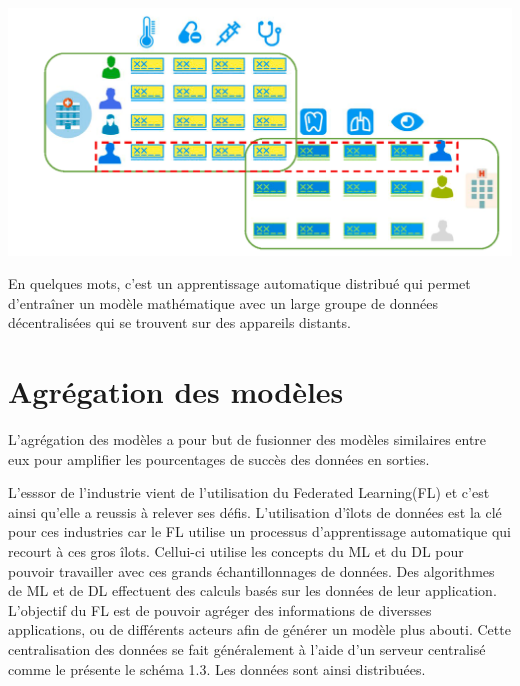 \documentclass[12pt,a4paper,french]{report}
\begin{document}
\begin{center}
	\includegraphics[scale=0.2]{fl_distribute}
	\label{fig1}
\end{center}

En quelques mots, c'est un apprentissage automatique distribué qui permet d'entraîner un modèle mathématique avec un large groupe de données décentralisées qui se trouvent sur des appareils distants.\\

\section{Agrégation des modèles}

L'agrégation des modèles a pour but de fusionner des modèles similaires entre eux pour amplifier les pourcentages de succès des données en sorties. 





L'esssor de l'industrie vient de l'utilisation du Federated Learning(FL) et c'est ainsi qu'elle a reussis à relever ses défis. L'utilisation d'îlots de données est la clé pour ces industries car le FL utilise un processus d'apprentissage automatique qui recourt à ces gros îlots. Cellui-ci utilise les concepts du ML et du DL pour pouvoir travailler avec ces grands échantillonnages de données. Des algorithmes de ML et de DL effectuent des calculs basés sur les données de leur application. L'objectif du FL est de pouvoir agréger des informations de diversses applications, ou de différents acteurs afin de générer un modèle plus abouti. Cette centralisation des données se fait généralement à l'aide d'un serveur centralisé comme le présente le schéma 1.3. Les données sont ainsi distribuées.
 
\end{document}
